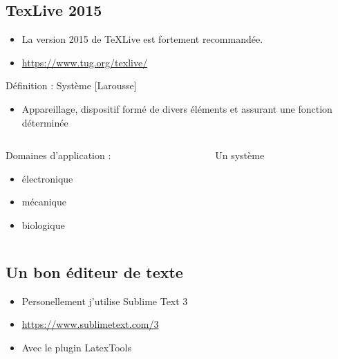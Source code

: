 \documentclass[./beamerCoursIsenLaTeX.tex]{subfiles}
\begin{document}
\subsection{TexLive 2015}
\begin{frame}
\begin{itemize}
\item La version 2015 de TeXLive est fortement recommandée.
\item \url{https://www.tug.org/texlive/}
\end{itemize}
  \begin{block}{Définition : Système [Larousse]}
    \begin{itemize}
      \item Appareillage, dispositif formé de divers éléments et assurant une fonction déterminée
    \end{itemize}
  \end{block}
  \null
\begin{columns}
\begin{column}{5cm}
Domaines d'application : 
\begin{itemize}
\itemsep1pt
\item électronique
\item mécanique
\item biologique
\end{itemize}
\end{column}
\begin{column}{6cm}
\begin{figure}[!ht]
\begin{center}
\end{center}
\caption{Un système}
\end{figure}
\end{column}
\end{columns}
\end{frame}
\subsection{Un bon éditeur de texte}
\begin{frame}
\begin{itemize}
\item Personellement j'utilise Sublime Text 3
\item \url{https://www.sublimetext.com/3}
\item Avec le plugin LatexTools
\end{itemize}
\cestimportant
\end{frame}
\end{document}
